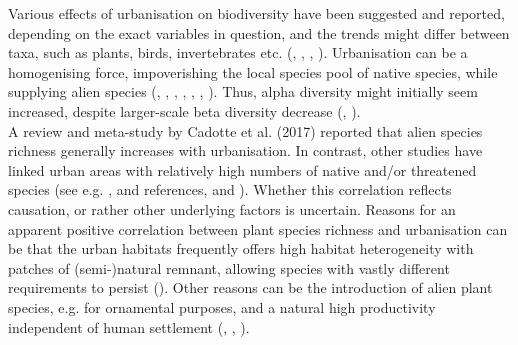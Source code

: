 \documentclass{article}
\begin{document}
Various effects of urbanisation on biodiversity have been suggested and reported, depending on the exact variables in question, and the trends might differ between taxa, such as plants, birds, invertebrates etc. (\cite{McKinney2002}, \cite{Kowarik2011}, \cite{Aronson2014}, \cite{Egerer2017}).
Urbanisation can be a homogenising force, impoverishing the local species pool of native species, while supplying alien species (\cite{Alberti2005}, \cite{Gaston2005}, \cite{Kuhn2006}, \cite{McKinney2002}, \cite{McKinney2006}, \cite{Gaertner2017}, \cite{Padayachee2017}). Thus, alpha diversity might initially seem increased, despite larger-scale beta diversity decrease (\cite{Blair1996}, \cite{Kuhn2006}).\\ 
A review and meta-study by Cadotte et al. (2017) reported that alien species richness generally increases with urbanisation.
In contrast, other studies have linked urban areas with relatively high numbers of native and/or threatened species (see e.g. \cite{Kuhn2006}, \cite{Kowarik2011} and references, and \cite{Ives2016}). Whether this correlation reflects causation, or rather other underlying factors is uncertain. Reasons for an apparent positive correlation between plant species richness and urbanisation can be that the urban habitats frequently offers high habitat heterogeneity with patches of (semi-)natural remnant, allowing species with vastly different requirements to persist (\cite{Francis2015}). Other reasons can be the introduction of alien plant species, e.g. for ornamental purposes, and a natural high productivity independent of human settlement (\cite{McKinney2002}, \cite{Kuhn2004}, \cite{Gaston2005}).\\

\end{document}
